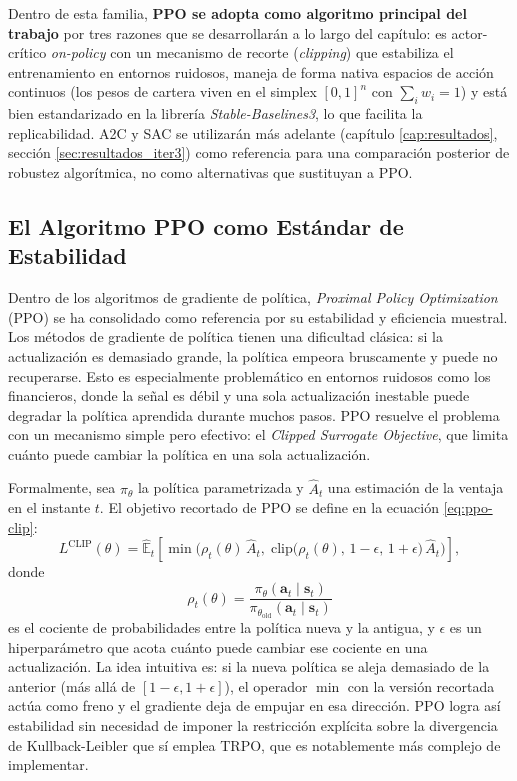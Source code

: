 \documentclass[IB,a4paper]{TFUOC}
\begin{document}
Dentro de esta familia, \textbf{PPO se adopta como algoritmo principal del trabajo} por tres razones que se desarrollarán a lo largo del capítulo: es actor-crítico \textit{on-policy} con un mecanismo de recorte (\textit{clipping}) que estabiliza el entrenamiento en entornos ruidosos, maneja de forma nativa espacios de acción continuos (los pesos de cartera viven en el simplex $[0,1]^n$ con $\sum_i w_i = 1$) y está bien estandarizado en la librería \textit{Stable-Baselines3}, lo que facilita la replicabilidad. A2C y SAC se utilizarán más adelante (capítulo \ref{cap:resultados}, sección \ref{sec:resultados_iter3}) como referencia para una comparación posterior de robustez algorítmica, no como alternativas que sustituyan a PPO.

\subsection{El Algoritmo PPO como Estándar de Estabilidad}

Dentro de los algoritmos de gradiente de política, \textit{Proximal Policy Optimization} (PPO) \citep{schulman2017ppo} se ha consolidado como referencia por su estabilidad y eficiencia muestral. Los métodos de gradiente de política tienen una dificultad clásica: si la actualización es demasiado grande, la política empeora bruscamente y puede no recuperarse. Esto es especialmente problemático en entornos ruidosos como los financieros, donde la señal es débil y una sola actualización inestable puede degradar la política aprendida durante muchos pasos. PPO resuelve el problema con un mecanismo simple pero efectivo: el \textit{Clipped Surrogate Objective}, que limita cuánto puede cambiar la política en una sola actualización.

Formalmente, sea $\pi_{\theta}$ la política parametrizada y $\hat{A}_t$ una estimación de la ventaja en el instante $t$. El objetivo recortado de PPO se define en la ecuación \eqref{eq:ppo-clip}:
\begin{equation}
L^{\mathrm{CLIP}}(\theta) = \hat{\mathbb{E}}_t \!\left[ \min\!\Big( \rho_t(\theta)\,\hat{A}_t,\; \mathrm{clip}\!\big(\rho_t(\theta),\, 1-\epsilon,\, 1+\epsilon\big)\,\hat{A}_t \Big) \right],
\label{eq:ppo-clip}
\end{equation}
donde
\begin{equation}
\rho_t(\theta) = \frac{\pi_{\theta}(\mathbf{a}_t \mid \mathbf{s}_t)}{\pi_{\theta_{\mathrm{old}}}(\mathbf{a}_t \mid \mathbf{s}_t)}
\end{equation}
es el cociente de probabilidades entre la política nueva y la antigua, y $\epsilon$ es un hiperparámetro que acota cuánto puede cambiar ese cociente en una actualización. La idea intuitiva es: si la nueva política se aleja demasiado de la anterior (más allá de $[1-\epsilon, 1+\epsilon]$), el operador $\min$ con la versión recortada actúa como freno y el gradiente deja de empujar en esa dirección. PPO logra así estabilidad sin necesidad de imponer la restricción explícita sobre la divergencia de Kullback-Leibler que sí emplea TRPO, que es notablemente más complejo de implementar.
\end{document}

